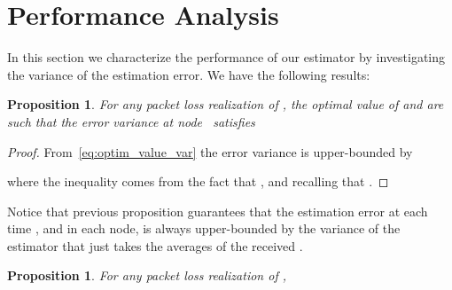 \documentclass[a4paper,notitlepage,onecolumn]{article}
\newtheorem{proposition}[theorem]{Proposition}
\numberwithin{equation}{section}
\begin{document}
\section{Performance Analysis}
\label{sec:performance_analysis}

In this section we characterize the performance of our estimator
by investigating the variance of the estimation error. We have the
following results:
\begin{proposition}
    \label{cor:bound-variance-node-i}
    For any packet loss realization  of , the optimal value of  and  are such that the error variance at node~ satisfies
    
\end{proposition}

\begin{proof}
From~\eqref{eq:optim_value_var} the error variance is upper-bounded
by

where the inequality comes from the fact that , and recalling that .
\end{proof}
Notice that previous proposition guarantees that the
estimation error at each time , and in each node, is
always upper-bounded by the variance of the estimator that
just takes the averages of the received .

\begin{proposition}
    \label{prop:bound-lM-Gamma}
    For any packet loss realization  of ,
    
\end{proposition}
\end{document}
